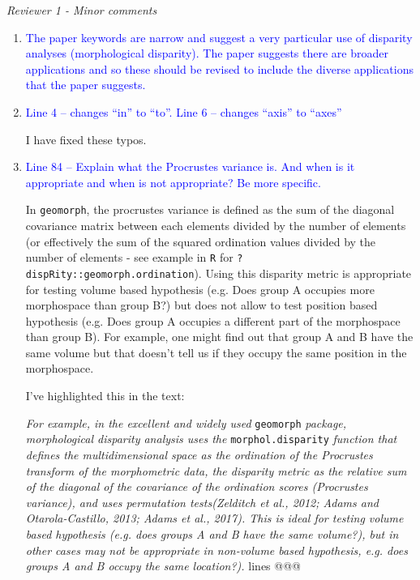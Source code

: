 \documentclass[12pt,letterpaper]{article}
\renewcommand{\subsection}[1]{%
\bigskip
\begin{center}
\begin{large}
\normalfont\itshape #1
\end{large}
\end{center}}
\begin{document}
\subsection{Reviewer 1 - Minor comments}

\begin{enumerate}

\item{\textcolor{blue}{The paper keywords are narrow and suggest a very particular use of disparity analyses (morphological disparity). The paper suggests there are broader applications and so these should be revised to include the diverse applications that the paper suggests. }}


\item{\textcolor{blue}{Line 4 – changes ``in'' to ``to''. Line 6 – changes ``axis'' to ``axes''}}
\label{abstract_typo}

I have fixed these typos.

\item{\textcolor{blue}{Line 84 – Explain what the Procrustes variance is. And when is it appropriate and when is not appropriate? Be more specific.}}

In \texttt{geomorph}, the procrustes variance is defined as the sum of the diagonal covariance matrix between each elements divided by the number of elements (or effectively the sum of the squared ordination values divided by the number of elements - see example in \texttt{R} for \texttt{?dispRity::geomorph.ordination}).
Using this disparity metric is appropriate for testing volume based hypothesis (e.g. Does group A occupies more morphospace than group B?) but does not allow to test position based hypothesis (e.g. Does group A occupies a different part of the morphospace than group B).
For example, one might find out that group A and B have the same volume but that doesn't tell us if they occupy the same position in the morphospace.

I've highlighted this in the text:

\textit{For example, in the excellent and widely used} \texttt{geomorph} \textit{package, morphological disparity analysis uses the} \texttt{morphol.disparity} \textit{function that defines the multidimensional space as the ordination of the Procrustes transform of the morphometric data, the disparity metric as the relative sum of the diagonal of the covariance of the ordination scores (Procrustes variance), and uses permutation tests(Zelditch et al., 2012; Adams and Otarola-Castillo, 2013; Adams et al., 2017). This is ideal for testing volume based hypothesis (e.g. does groups A and B have the same volume?), but in other cases may not be appropriate in non-volume based hypothesis, e.g. does groups A and B occupy the same location?).} lines @@@


\end{enumerate}
\end{document}
